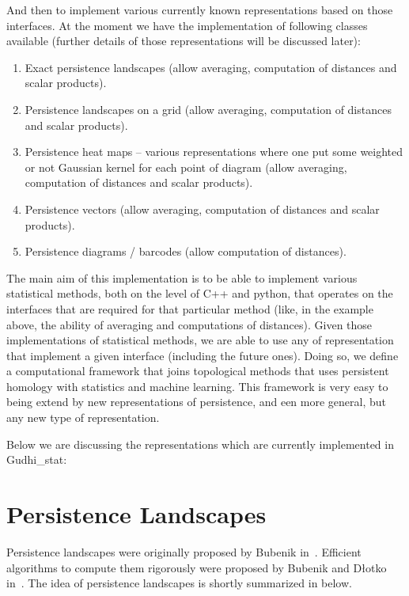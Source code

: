 \documentclass[11pt]{article}
\begin{document}
And then to implement various currently known representations based on those interfaces. At the moment we have the implementation of following classes available (further details of those representations will be discussed later):
\begin{enumerate}
\item Exact persistence landscapes (allow averaging, computation of distances and scalar products).
\item Persistence landscapes on a grid (allow averaging, computation of distances and scalar products).
\item Persistence heat maps – various representations where one put some weighted or not Gaussian kernel for each point of diagram (allow averaging, computation of distances and scalar products).
\item Persistence vectors (allow averaging, computation of distances and scalar products).
\item Persistence diagrams / barcodes (allow computation of distances).
\end{enumerate}


The main aim of this implementation is to be able to implement various statistical methods, both on the level of C++ and python, that operates on the interfaces that are required for that particular method (like, in the example above, the ability of averaging and computations of distances). Given those implementations of statistical methods, we are able to use any of representation that implement a given interface (including the future ones). 
Doing so, we define a computational framework that joins topological methods that uses persistent homology with statistics and machine learning. This framework is very easy to being extend by new representations of persistence, and een more general, but any new type of representation.

Below we are discussing the representations which are currently implemented in Gudhi\_stat:


\section{Persistence Landscapes}
\label{sec:persistence_landscapes}
Persistence landscapes were originally proposed by Bubenik in~\cite{landscapes1}. Efficient algorithms to compute them rigorously were proposed by Bubenik and D{\l}otko in~\cite{landscapes2}. The idea of persistence landscapes is shortly summarized in below.
\end{document}
